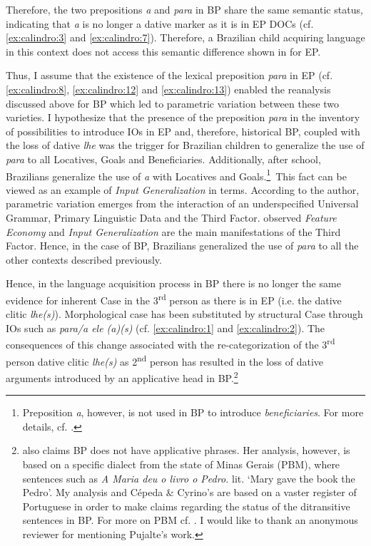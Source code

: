 \documentclass[output=paper,colorlinks,citecolor=brown,nonflat]{./langscibook}
\begin{document}
Therefore, the two prepositions \textit{a} and \textit{para} in BP share the same semantic status, indicating that \textit{a} is no longer a dative marker as it is in EP DOCs (cf. \ref{ex:calindro:3} and \ref{ex:calindro:7}). Therefore, a Brazilian child acquiring language in this context does not access this semantic difference shown in  for EP.

Thus, I assume that the existence of the lexical preposition \textit{para} in EP (cf. \ref{ex:calindro:8}, \ref{ex:calindro:12} and \ref{ex:calindro:13}) enabled the reanalysis discussed above for BP which led to parametric variation between these two varieties. I hypothesize that the presence of the preposition \textit{para} in the inventory of possibilities to introduce IOs in EP and, therefore, historical BP, coupled with the loss of dative \textit{lhe} was the trigger for Brazilian children to generalize the use of \textit{para} to all Locatives, Goals and Beneficiaries. Additionally, after school, Brazilians generalize the use of \textit{a} with Locatives and Goals.\footnote{Preposition \textit{a}, however, is not used in BP to introduce \textit{beneficiaries}. For more details, cf. \citet{Calindro2015}.}~This fact can be viewed as an example of \textit{Input Generalization} in  terms. According to the author, parametric variation emerges from the interaction of an underspecified Universal Grammar, Primary Linguistic Data and the Third Factor. \citet{BiberauerRoberts2015} observed \textit{Feature Economy} and \textit{Input Generalization} are the main manifestations of the Third Factor. Hence, in the case of BP, Brazilians generalized the use of \textit{para} to all the other contexts described previously.

Hence, in the language acquisition process in BP there is no longer the same evidence for inherent Case in the 3\textsuperscript{rd} person as there is in EP (i.e. the dative clitic \textit{lhe(s)}). Morphological case has been substituted by structural Case through IOs such as \textit{para/a ele (a)(s)} (cf. \ref{ex:calindro:1} and \ref{ex:calindro:2}). The consequences of this change associated with the re-categorization of the 3\textsuperscript{rd} person dative clitic \textit{lhe(s)} as 2\textsuperscript{nd} person has resulted in the loss of dative arguments introduced by an applicative head in BP.\footnote{\citet{Pujalte2010} also claims BP does not have applicative phrases. Her analysis, however, is based on a specific dialect from the state of Minas Gerais (PBM), where sentences such as
\textit{A Maria deu o livro o Pedro.}
lit. ‘Mary gave the book the Pedro’. My analysis and Cépeda \& Cyrino’s are based on a vaster register of Portuguese in order to make claims regarding the status of the ditransitive sentences in BP. For more on PBM cf. \citet{Scher1996, TorresMoraisSalles2010}. I would like to thank an anonymous reviewer for mentioning Pujalte’s work.}
\end{document}

